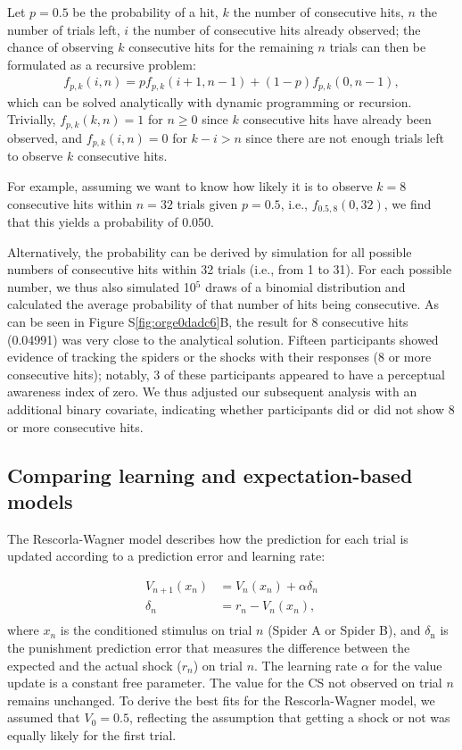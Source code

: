 \documentclass[12pt]{article}
\begin{document}
Let \(p = 0.5\) be the probability of a hit, \(k\) the number of consecutive
hits, \(n\) the number of trials left, \(i\) the number of consecutive hits
already observed; the chance of observing \(k\) consecutive hits for the
remaining \(n\) trials can then be formulated as a recursive problem:
\begin{align}
f_{p, k}(i, n) = pf_{p, k}(i + 1, n - 1) + (1 - p) f_{p, k}(0, n-1),
\end{align}
which can be solved analytically with dynamic programming or recursion.
Trivially, \(f_{p, k}(k, n) = 1\) for \(n \geq 0\) since \(k\) consecutive
hits have already been observed, and \(f_{p, k}(i, n) = 0\) for \(k - i >
n\) since there are not enough trials left to observe \(k\) consecutive
hits.  

For example, assuming we want to know how likely it is to observe \(k =
8\) consecutive hits within \(n = 32\) trials given \(p = 0.5\), i.e.,
\(f_{0.5, 8}(0, 32)\), we find that this yields a probability of 0.050.

Alternatively, the probability can be derived by simulation for all
possible numbers of consecutive hits within 32 trials (i.e., from 1 to
31). For each possible number, we thus also simulated 10\(^{\text{5}}\) draws of a
binomial distribution and calculated the average probability of that
number of hits being consecutive. As can be seen in Figure
S\ref{fig:orge0dadc6}B, the result for 8 consecutive hits
(0.04991) was very close to the analytical
solution. Fifteen participants showed evidence of tracking the spiders
or the shocks with their responses (8 or more consecutive hits);
notably, 3 of these participants appeared to have a perceptual awareness
index of zero. We thus adjusted our subsequent analysis with an
additional binary covariate, indicating whether participants did or did
not show 8 or more consecutive hits.

\subsection*{Comparing learning and expectation-based models}
\label{sec:org536b900}
The Rescorla-Wagner model \cite{Rescorla1972} describes how the
prediction for each trial is updated according to a prediction error and
learning rate:

\begin{equation}
\begin{aligned}
V_{n+1}(x_{n}) &= V_{n}(x_{n}) + \alpha \delta_{n} \\
\delta_{n} &= r_{n} - V_{n}(x_{n}), \\
\end{aligned}
\end{equation}
where \(x_{n}\) is the conditioned stimulus on trial \(n\) (Spider A or
Spider B), and \(\delta_{\text{n}}\) is the punishment prediction error that
measures the difference between the expected and the actual shock
(\(r_{n}\)) on trial \(n\). The learning rate \(\alpha\) for the value update is
a constant free parameter. The value for the CS not observed on trial
\(n\) remains unchanged. To derive the best fits for the Rescorla-Wagner
model, we assumed that \(V_{0} = 0.5\), reflecting the assumption that
getting a shock or not was equally likely for the first trial.
\end{document}
